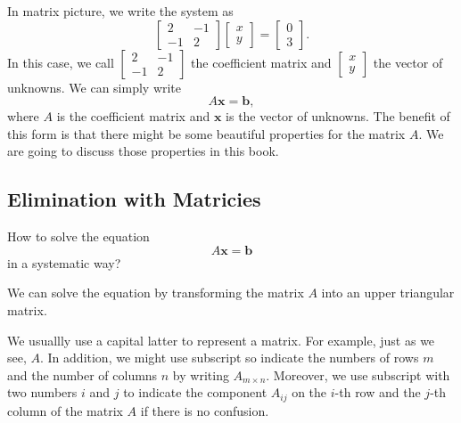 \documentclass[11pt]{article}
\theoremstyle{break}
\theoremstyle{no_label}
\newcommand{\bfb}{\textbf{b}}
\newcommand{\bfx}{\textbf{x}}
\numberwithin{equation}{section}
\begin{document}
In matrix picture, we write the system as
\begin{equation}\label{example equation in form of matrix}
    \begin{bmatrix}
        2 & -1 \\ -1 & 2
    \end{bmatrix}\begin{bmatrix}
        x \\ y
    \end{bmatrix}=\begin{bmatrix}
        0 \\ 3
    \end{bmatrix}.
\end{equation}
In this case, we call $\begin{bmatrix}
    2 & -1 \\ -1 & 2
\end{bmatrix}$ the coefficient matrix and $\begin{bmatrix}
    x \\ y
\end{bmatrix}$ the vector of unknowns. We can simply write \begin{equation*}
    A\bfx=\bfb,
\end{equation*}
where $A$ is the coefficient matrix and $\bfx$ is the vector of unknowns. The benefit of this form is that there might be some beautiful properties for the matrix $A$. We are going to discuss those properties in this book.

\subsection{Elimination with Matricies}

\begin{question}
    How to solve the equation \begin{equation*}
        A\bfx=\bfb
    \end{equation*}
    in a systematic way?
\end{question}

We can solve the equation by transforming the matrix $A$ into an upper triangular matrix.

\begin{notation}[Matrix]
    We usuallly use a capital latter to represent a matrix. For example, just as we see, $A$. In addition, we might use subscript so indicate the numbers of rows $m$ and the number of columns $n$ by writing $A_{m\times n}$. Moreover, we use subscript with two numbers $i$ and $j$ to indicate the component $A_{ij}$ on the $i$-th row and the $j$-th column of the matrix $A$ if there is no confusion.
\end{notation}
\end{document}
